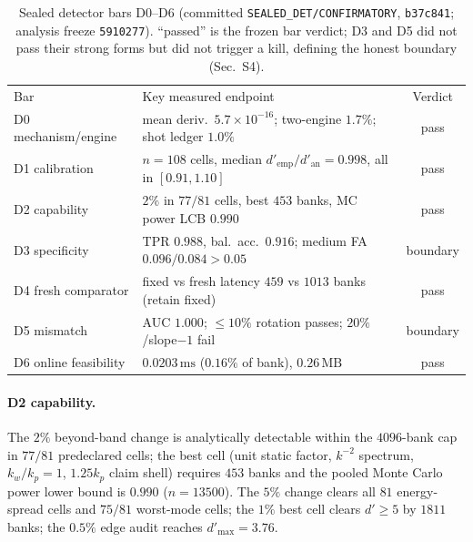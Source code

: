 \documentclass[aps,prl,onecolumn,notitlepage,nofootinbib,superscriptaddress]{revtex4-2}
\begin{document}
\begin{table}[h]
\centering
\caption{Sealed detector bars D0--D6 (committed \texttt{SEALED\_DET/CONFIRMATORY},
\texttt{b37c841}; analysis freeze \texttt{5910277}). ``passed'' is the frozen
bar verdict; D3 and D5 did not pass their strong forms but did not trigger a
kill, defining the honest boundary (Sec.~S4).}
\label{tab:bars}
\begin{ruledtabular}
\begin{tabular}{llc}
Bar & Key measured endpoint & Verdict\\
\colrule
D0 mechanism/engine & mean deriv.\ $5.7\times10^{-16}$; two-engine $1.7\%$; shot ledger $1.0\%$ & pass\\
D1 calibration      & $n=108$ cells, median $d'_{\mathrm{emp}}/d'_{\mathrm{an}}=0.998$, all in $[0.91,1.10]$ & pass\\
D2 capability       & $2\%$ in $77/81$ cells, best $453$ banks, MC power LCB $0.990$ & pass\\
D3 specificity      & TPR $0.988$, bal.\ acc.\ $0.916$; medium FA $0.096/0.084>0.05$ & boundary\\
D4 fresh comparator & fixed vs fresh latency $459$ vs $1013$ banks (retain fixed) & pass\\
D5 mismatch         & AUC $1.000$; $\le10\%$ rotation passes; $20\%$/slope$-1$ fail & boundary\\
D6 online feasibility & $0.0203\,\mathrm{ms}$ ($0.16\%$ of bank), $0.26\,\mathrm{MB}$ & pass\\
\end{tabular}
\end{ruledtabular}
\end{table}

\paragraph*{D2 capability.}
The $2\%$ beyond-band change is analytically detectable within the $4096$-bank
cap in $77/81$ predeclared cells; the best cell (unit static factor, $k^{-2}$
spectrum, $k_w/k_p=1$, $1.25k_p$ claim shell) requires $453$ banks and the pooled
Monte Carlo power lower bound is $0.990$ ($n=13500$). The $5\%$ change clears all
$81$ energy-spread cells and $75/81$ worst-mode cells; the $1\%$ best cell clears
$d'\ge5$ by $1811$ banks; the $0.5\%$ edge audit reaches $d'_{\max}=3.76$.
\end{document}

